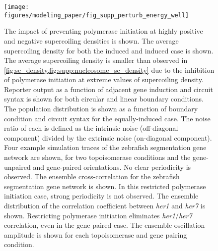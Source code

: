 \documentclass[11pt]{article}
\begin{document}
\begin{figure}[htbp]
    \centering
    {\texttt{[image: figures/modeling\_paper/fig\_supp\_perturb\_energy\_well]}
    \label{fig:supp:energy_well_sc_density}
    \label{fig:supp:energy_well_induction_sweep}
    \label{fig:supp:energy_well_joint_distribution}
    \label{fig:supp:energy_well_zinani_examples}
    \label{fig:supp:energy_well_zinani_crosscorr}
    \label{fig:supp:energy_well_zinani_correlation_coefficient}
    \label{fig:supp:energy_well_zinani_oscillation_amplitude}
    }
\end{figure}
\begin{figure}
    \ContinuedFloat
    \caption{The impact of preventing polymerase initiation at highly positive and negative supercoiling densities is shown.
         The average supercoiling density for both the induced and induced case is shown. The average supercoiling density is smaller than observed in \cref{fig:sc_density,fig:supp:nucleosome_sc_density} due to the inhibition of polymerase initiation at extreme values of supercoiling density.
         Reporter output as a function of adjacent gene induction and circuit syntax is shown for both circular and linear boundary conditions.
         The population distribution is shown as a function of boundary condition and circuit syntax for the equally-induced case. The noise ratio of each is defined as the intrinsic noise (off-diagonal component) divided by the extrinsic noise (on-diagonal component).
         Four example simulation traces of the zebrafish segmentation gene network are shown, for two topoisomerase conditions and the gene-unpaired and gene-paired orientations. No clear periodicity is observed.
         The ensemble cross-correlation for the zebrafish segmentation gene network is shown. In this restricted polymerase initiation case, strong periodicity is not observed.
         The ensemble distribution of the correlation coefficient between \textit{her1} and \textit{her7} is shown. Restricting polymerase initiation eliminates \emph{her1}/\emph{her7} correlation, even in the gene-paired case.
         The ensemble oscillation amplitude is shown for each topoisomerase and gene pairing condition.
    }
    \label{fig:top:supp_perturb_energy_well}
\end{figure}
\end{document}
